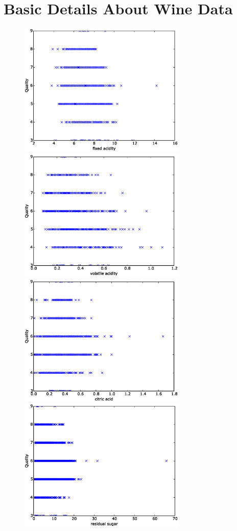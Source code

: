 \documentclass[11pt]{article}
\begin{document}
\section*{Basic Details About Wine Data}


\begin{figure}[h]
  \centering
  \includegraphics[width=8cm]{fixed_acidity.eps}
  \includegraphics[width=8cm]{volatile_acidity.eps}
  \includegraphics[width=8cm]{citric_acid.eps}
  \includegraphics[width=8cm]{residual_sugar.eps}

\end{figure}
\end{document}
